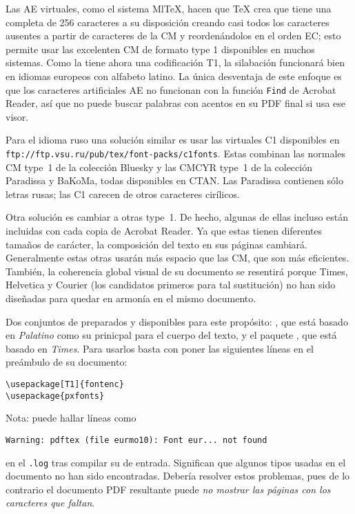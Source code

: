 Las \fontsnomo{} AE virtuales, como el sistema {Ml\TeX}, hacen que \TeX{} crea que tiene una \fontnomo{} completa de 256 caracteres a su disposición creando casi todos los caracteres ausentes a partir de caracteres de la \fontnomo{} CM y reordenándolos en el orden EC; esto permite usar las excelenten \fontsnomo{} CM de formato type 1 disponibles en muchos sistemas.  Como la \fontnomo{} tiene ahora una codificación T1, la silabación funcionará bien en idiomas europeos con alfabeto latino.  La única desventaja de este enfoque es que los caracteres artificiales AE no funcionan con la función \texttt{Find} de Acrobat Reader, así que no puede buscar palabras con acentos en su \filenomo{} PDF final si usa ese visor.

Para el idioma ruso una solución similar es usar las \fontsnomo{} virtuales C1 disponibles en \texttt{ftp://ftp.vsu.ru/pub/tex/font-packs/c1fonts}.  Estas \fontsnomo{} combinan las \fontsnomo{} normales CM type~1 de la colección Bluesky y las \fontsnomo{} CMCYR type~1 de la colección Paradissa y BaKoMa, todas disponibles en CTAN.  Las \fontsnomo{} Paradissa contienen sólo letras rusas; las \fontsnomo{} C1 carecen de otros caracteres cirílicos.

Otra solución es cambiar a otras \fontsnomo{} \PSi{} type~1. De hecho, algunas de ellas incluso están incluidas con cada copia de Acrobat Reader.  Ya que estas \fontsnomo{} tienen diferentes tamaños de carácter, la composición del texto en sus páginas cambiará. Generalmente estas otras \fontsnomo{} usarán más espacio que las \fontsnomo{} CM, que son más eficientes.  También, la coherencia global visual de su documento se resentirá porque  Times, Helvetica y Courier (los candidatos primeros para tal sustitución) no han sido diseñadas para quedar en armonía en el mismo documento.

Dos conjuntos de \fontsnomo{} preparados y disponibles para este propósito: , que está basado en \emph{Palatino} como su prinicpal \fontnomo{} para el cuerpo del texto, y el paquete , que está basado en \emph{Times}.  Para usarlos basta con poner las siguientes líneas en el preámbulo de su documento:
\begin{code}
\begin{verbatim}
\usepackage[T1]{fontenc}
\usepackage{pxfonts}
\end{verbatim}
\end{code}

Nota: puede hallar líneas como
\begin{verbatim}
Warning: pdftex (file eurmo10): Font eur... not found
\end{verbatim}
en el \filenomo{} \texttt{.log} tras compilar su \filenomo{} de entrada. Significan que algunos tipos usadas en el documento no han sido encontradas.  Debería resolver estos problemas, pues de lo contrario el documento PDF resultante puede \emph{no mostrar las páginas con los caracteres que faltan}.

